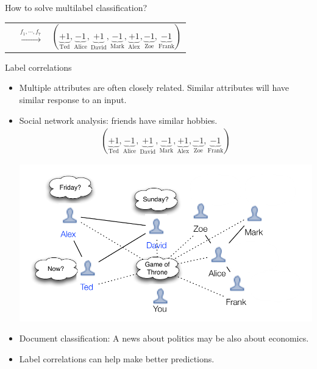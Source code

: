 \documentclass[first=dgreen,second=purple,logo=yellowexc]{aaltoslides}
\begin{document}
{\begin{frame}{How to solve multilabel classification?}
{\begin{tabular}{p{1.5cm}p{0.5cm}p{3cm}}
	& $\overset{f_1,\cdots,f_7}{\rightarrow}$ &$(\underbrace{+1}_{\text{Ted}},\underbrace{-1}_{\text{Alice}},\underbrace{+1}_{\text{David}},\underbrace{-1}_{\text{Mark}},\underbrace{+1}_{\text{Alex}},\underbrace{-1}_{\text{Zoe}},\underbrace{-1}_{\text{Frank}})$\\
    \end{tabular}
	}
	
	
	
\end{frame}


\begin{frame}{Label correlations}
	\begin{itemize}
		\item Multiple attributes are often closely related. Similar attributes will have similar response to an input.
		\item Social network analysis: friends have similar hobbies.
		\begin{align*}
	(\underbrace{+1}_{\text{Ted}},\underbrace{-1}_{\text{Alice}},\underbrace{+1}_{\text{David}},\underbrace{-1}_{\text{Mark}},\underbrace{+1}_{\text{Alex}},\underbrace{-1}_{\text{Zoe}},\underbrace{-1}_{\text{Frank}})
		\end{align*}
		\begin{center}
			\includegraphics[scale=0.5]{./figures/facebooknetwork.pdf}
		\end{center}
		\item Document classification: A news about politics may be also about economics. 
		\item Label correlations can help make better predictions.
	\end{itemize}
\end{frame}


}
\end{document}
